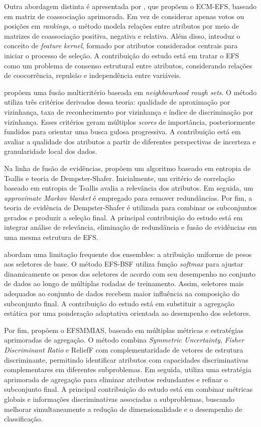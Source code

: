 Outra abordagem distinta é apresentada por , que propõem o ECM-EFS, baseado em matriz de coassociação aprimorada. Em vez de considerar apenas votos ou posições em \textit{rankings}, o método modela relações entre atributos por meio de matrizes de coassociação positiva, negativa e relativa. Além disso, introduz o conceito de \textit{feature kernel}, formado por atributos considerados centrais para iniciar o processo de seleção. A contribuição do estudo está em tratar o EFS como um problema de consenso estrutural entre atributos, considerando relações de coocorrência, repulsão e independência entre variáveis.

 propõem uma fusão multicritério baseada em \textit{neighbourhood rough sets}. O método utiliza três critérios derivados dessa teoria: qualidade de aproximação por vizinhança, taxa de reconhecimento por vizinhança e índice de discriminação por vizinhança. Esses critérios geram múltiplos \textit{scores} de importância, posteriormente fundidos para orientar uma busca gulosa progressiva. A contribuição está em avaliar a qualidade dos atributos a partir de diferentes perspectivas de incerteza e granularidade local dos dados.

Na linha de fusão de evidências,  propõem um algoritmo baseado em entropia de Tsallis e teoria de Dempster-Shafer. Inicialmente, um critério de correlação baseado em entropia de Tsallis avalia a relevância dos atributos. Em seguida, um \textit{approximate Markov blanket} é empregado para remover redundâncias. Por fim, a teoria de evidência de Dempster-Shafer é utilizada para combinar os subconjuntos gerados e produzir a seleção final. A principal contribuição do estudo está em integrar análise de relevância, eliminação de redundância e fusão de evidências em uma mesma estrutura de EFS.

 abordam uma limitação frequente dos ensembles: a atribuição uniforme de pesos aos seletores de base. O método EFS-BSF utiliza função \textit{softmax} para ajustar dinamicamente os pesos dos seletores de acordo com seu desempenho no conjunto de dados ao longo de múltiplas rodadas de treinamento. Assim, seletores mais adequados ao conjunto de dados recebem maior influência na composição do subconjunto final. A contribuição do estudo está em substituir a agregação estática por uma ponderação adaptativa orientada ao desempenho dos seletores.

Por fim,  propõem o EFSMMIAS, baseado em múltiplas métricas e estratégias aprimoradas de agregação. O método combina \textit{Symmetric Uncertainty}, \textit{Fisher Discriminant Ratio} e ReliefF com complementaridade de vetores de estrutura discriminante, permitindo identificar atributos com capacidades discriminativas complementares em diferentes subproblemas. Em seguida, utiliza uma estratégia aprimorada de agregação para eliminar atributos redundantes e refinar o subconjunto final. A principal contribuição do estudo está em combinar métricas globais e informações discriminativas associadas a subproblemas, buscando melhorar simultaneamente a redução de dimensionalidade e o desempenho de classificação.

